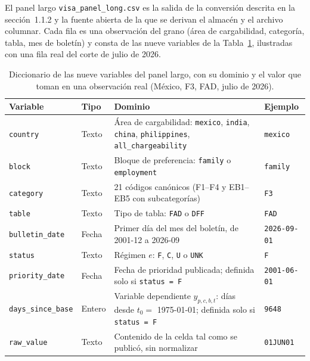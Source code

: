 \documentclass[12pt,letterpaper]{report}
\begin{document}
El panel largo \texttt{visa\_panel\_long.csv} es la salida de la conversión descrita en la
sección~1.1.2 y la fuente abierta de la que se derivan el almacén y el archivo columnar.
Cada fila es una observación del grano (área de cargabilidad, categoría, tabla, mes de
boletín) y consta de las nueve variables de la Tabla~\ref{tab:diccionario}, ilustradas con
una fila real del corte de julio de 2026.

\begin{table}[H]
\centering
\footnotesize
\caption[Diccionario de datos del panel]{Diccionario de las nueve variables del panel largo,
con su dominio y el valor que toman en una observación real (México, F3, FAD, julio de 2026).}
\label{tab:diccionario}
\begin{tabular}{p{2.9cm}p{1.9cm}p{5.2cm}p{3.3cm}}
\toprule
\rowcolor{uacjblue!15}
\textbf{Variable} & \textbf{Tipo} & \textbf{Dominio} & \textbf{Ejemplo} \\ \midrule
\texttt{country}         & Texto   & Área de cargabilidad: \texttt{mexico}, \texttt{india}, \texttt{china}, \texttt{philippines}, \texttt{all\_chargeability} & \texttt{mexico} \\
\texttt{block}           & Texto   & Bloque de preferencia: \texttt{family} o \texttt{employment} & \texttt{family} \\
\texttt{category}        & Texto   & 21 códigos canónicos (F1--F4 y EB1--EB5 con subcategorías) & \texttt{F3} \\
\texttt{table}           & Texto   & Tipo de tabla: \texttt{FAD} o \texttt{DFF} & \texttt{FAD} \\
\texttt{bulletin\_date}  & Fecha   & Primer día del mes del boletín, de 2001-12 a 2026-09 & \texttt{2026-09-01} \\
\texttt{status}          & Texto   & Régimen $e$: \texttt{F}, \texttt{C}, \texttt{U} o \texttt{UNK} & \texttt{F} \\
\texttt{priority\_date}  & Fecha   & Fecha de prioridad publicada; definida solo si \texttt{status = F} & \texttt{2001-06-01} \\
\texttt{days\_since\_base} & Entero & Variable dependiente $y_{p,c,b,t}$: días desde $t_0 = $ 1975-01-01; definida solo si \texttt{status = F} & \texttt{9648} \\
\texttt{raw\_value}      & Texto   & Contenido de la celda tal como se publicó, sin normalizar & \texttt{01JUN01} \\
\bottomrule
\end{tabular}
\end{table}
\end{document}
